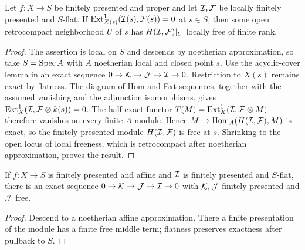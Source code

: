 \begin{theorem}
\label{akcp-1-3-local-free}
Let $f:X\to S$ be finitely presented and proper and let $\mathcal I,\mathcal F$ be locally
finitely presented and $S$-flat.  If
$\operatorname{Ext}^1_{X(s)}(\mathcal I(s),\mathcal F(s))=0$ at $s\in S$, then some open retrocompact
neighborhood $U$ of $s$ has $H(\mathcal I,\mathcal F)|_U$ locally free of finite rank.
\end{theorem}
\begin{proof}
The assertion is local on $S$ and descends by noetherian approximation, so
take $S=\operatorname{Spec} A$ with $A$ noetherian local and closed point $s$.  Use the
acyclic-cover lemma in an exact sequence
$0\to\mathcal K\to\mathcal J\to\mathcal I\to0$.  Restriction to $X(s)$ remains exact by flatness.
The diagram of Hom and Ext sequences, together with the assumed vanishing and
the adjunction isomorphisms, gives
$\operatorname{Ext}^1_X(\mathcal I,\mathcal F\otimes k(s))=0$.  The half-exact functor
$T(M)=\operatorname{Ext}^1_X(\mathcal I,\mathcal F\otimes M)$ therefore vanishes on every finite
$A$-module.  Hence $M\mapsto\operatorname{Hom}_A(H(\mathcal I,\mathcal F),M)$ is exact, so the finitely
presented module $H(\mathcal I,\mathcal F)$ is free at $s$.  Shrinking to the open locus of
local freeness, which is retrocompact after noetherian approximation, proves
the result.
\end{proof}

\begin{lemma}
\label{akcp-1-4-free-presentation}
If $f:X\to S$ is finitely presented and affine and $\mathcal I$ is finitely presented
and $S$-flat, there is an exact sequence
$0\to\mathcal K\to\mathcal J\to\mathcal I\to0$ with $\mathcal K,\mathcal J$ finitely presented and $\mathcal J$
free.
\end{lemma}
\begin{proof}
Descend to a noetherian affine approximation.  There a finite presentation of
the module has a finite free middle term; flatness preserves exactness after
pullback to $S$.
\end{proof}

